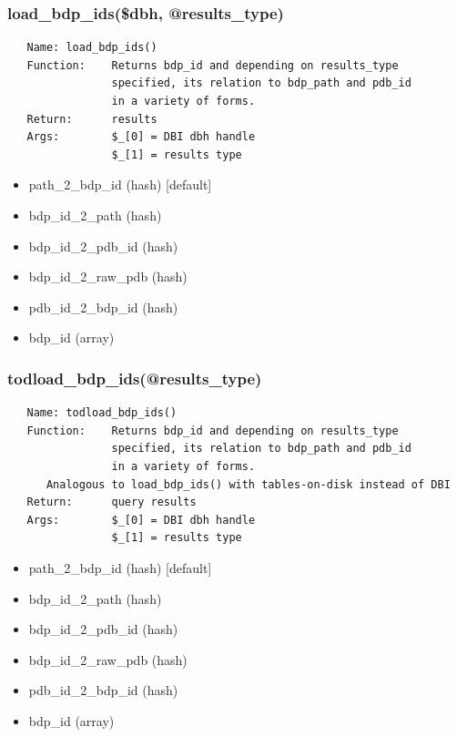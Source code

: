 \documentclass{article}
\begin{document}
\subsubsection*{load\_bdp\_ids(\$dbh, @results\_type)\label{pibase_pm_load_bdp_ids_dbh_results_type_}}
\begin{verbatim}
   Name: load_bdp_ids()
   Function:    Returns bdp_id and depending on results_type
                specified, its relation to bdp_path and pdb_id
                in a variety of forms.
   Return:      results
   Args:        $_[0] = DBI dbh handle
                $_[1] = results type
\end{verbatim}
\begin{itemize}

\item path\_2\_bdp\_id (hash) [default]
\item bdp\_id\_2\_path (hash)
\item bdp\_id\_2\_pdb\_id (hash)
\item bdp\_id\_2\_raw\_pdb (hash)
\item pdb\_id\_2\_bdp\_id (hash)
\item bdp\_id (array)\end{itemize}
\subsubsection*{todload\_bdp\_ids(@results\_type)\label{pibase_pm_todload_bdp_ids_results_type_}}
\begin{verbatim}
   Name: todload_bdp_ids()
   Function:    Returns bdp_id and depending on results_type
                specified, its relation to bdp_path and pdb_id
                in a variety of forms.
      Analogous to load_bdp_ids() with tables-on-disk instead of DBI
   Return:      query results
   Args:        $_[0] = DBI dbh handle
                $_[1] = results type
\end{verbatim}
\begin{itemize}

\item path\_2\_bdp\_id (hash) [default]
\item bdp\_id\_2\_path (hash)
\item bdp\_id\_2\_pdb\_id (hash)
\item bdp\_id\_2\_raw\_pdb (hash)
\item pdb\_id\_2\_bdp\_id (hash)
\item bdp\_id (array)\end{itemize}
\end{document}
